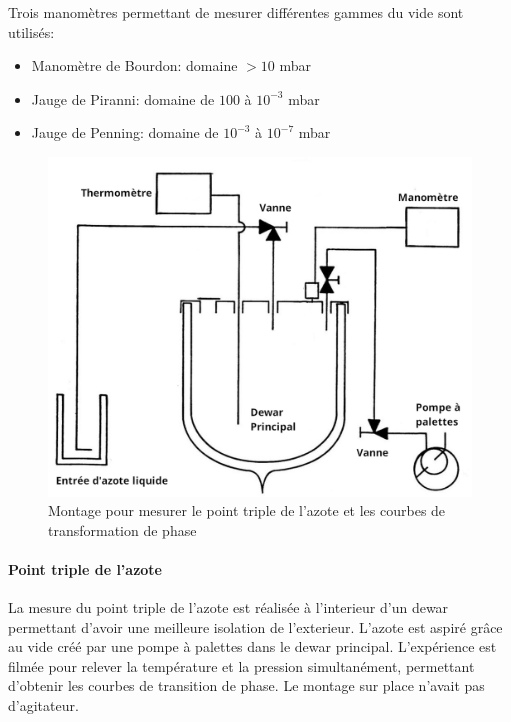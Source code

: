 Trois manomètres permettant de mesurer différentes gammes du vide sont utilisés:

\begin{itemize}
    \item Manomètre de Bourdon: domaine \(> 10\) \unit{\milli\bar}
    \item Jauge de Piranni: domaine de \(100\) à \(10^{-3}\) \unit{\milli\bar}
    \item Jauge de Penning: domaine de \(10^{-3}\) à \(10^{-7}\) \unit{\milli\bar}
\end{itemize}


\begin{minipage}{\textwidth}
\begin{figure}
    \includegraphics[width=\linewidth]{figures/montage_point_triple.png}
    \caption{Montage pour mesurer le point triple de l'azote et les courbes de transformation de phase}
    \label{fig:montagepointtriple}
\end{figure}

\paragraph*{Point triple de l'azote}
La mesure du point triple de l'azote est réalisée à l'interieur d'un dewar permettant d'avoir une meilleure isolation de l'exterieur. L'azote est aspiré grâce au vide créé par une pompe à palettes dans le dewar principal. L'expérience est filmée pour relever la température et la pression simultanément, permettant d'obtenir les courbes de transition de phase. Le montage sur place n'avait pas d'agitateur.
\end{minipage}

